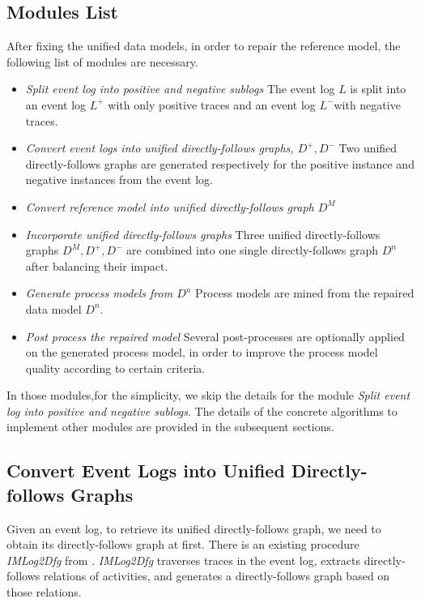 \subsection{Modules List}
After fixing the unified data models, in order to repair the reference model, the following list of modules are necessary. 
\begin{itemize}
	\item \emph{Split event log into positive and negative sublogs } \quad
	The event log $L$ is split into an event log $L^+$ with only positive traces and an event log $L^-$with negative traces.
	\item \emph{Convert event logs into unified directly-follows graphs, $D^+, D^-$}\quad 
	Two unified directly-follows graphs are generated respectively for the positive instance and negative instances from the event log.
	\item \emph{Convert reference model into unified directly-follows graph $D^M$}\quad 
	\item \emph{Incorporate unified directly-follows graphs} \quad
	Three unified directly-follows  graphs $D^M, D^+, D^-$ are combined into one single directly-follows graph $D^n$ after balancing their impact.
	\item \emph{Generate process models from $D^n$} \quad
	Process models are mined from the repaired data model $D^n$.
	\item \emph{Post process the repaired model} \quad
	Several post-processes are optionally applied on the generated process model, in order to improve the process model quality according to certain criteria.
\end{itemize}
In those modules,for the simplicity, we skip the details for the module \emph{Split event log into positive and negative sublogs}. The details of the concrete algorithms to implement other modules are provided in the subsequent sections.
\subsection{Convert Event Logs into Unified Directly-follows Graphs}
Given an event log, to retrieve its unified directly-follows graph, we need to obtain its directly-follows graph at first. There is an existing procedure \emph{IMLog2Dfg} from  \cite{leemans2013discovering}. \emph{IMLog2Dfg} traverses traces in the event log, extracts directly-follows relations of activities, and generates a directly-follows graph based on those relations. 

